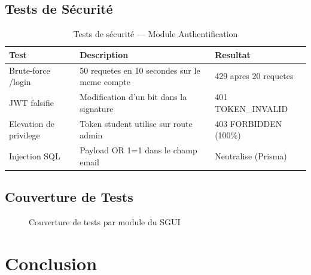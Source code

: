 \documentclass[12pt,a4paper,oneside]{report}
\begin{document}
\subsection{Tests de Sécurité}

\begin{table}[H]
\centering
\caption{Tests de sécurité — Module Authentification}
\begin{tabularx}{\linewidth}{@{}lLl@{}}
\toprule
\textbf{Test} & \textbf{Description} & \textbf{Resultat} \\
\midrule
Brute-force /login &
  50 requetes en 10 secondes sur le meme compte &
  429 apres 20 requetes \\
JWT falsifie &
  Modification d'un bit dans la signature &
  401 TOKEN\_INVALID \\
Elevation de privilege &
  Token student utilise sur route admin &
  403 FORBIDDEN (100\%) \\
Injection SQL &
  Payload OR 1=1 dans le champ email &
  Neutralise (Prisma) \\
\bottomrule
\end{tabularx}
\end{table}

\subsection{Couverture de Tests}

\begin{figure}[H]
\centering
{}
\caption{Couverture de tests par module du SGUI}
\label{fig:coverage}
\end{figure}

\section{Conclusion}
\end{document}
